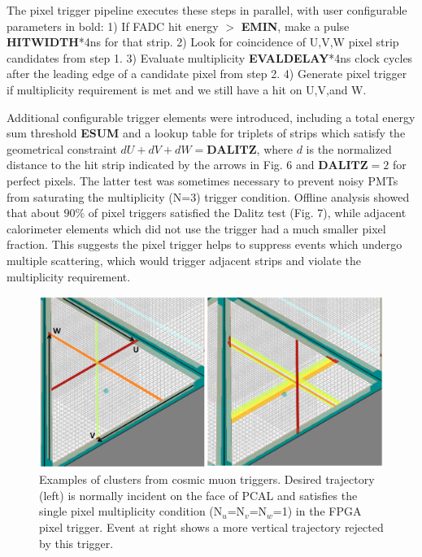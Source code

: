 The pixel trigger pipeline executes these steps in parallel, with user configurable parameters in bold:
  1) If FADC hit energy $>$ \textbf{EMIN}, make a pulse \textbf{HITWIDTH}*4ns for that strip.
  2) Look for coincidence of U,V,W pixel strip candidates from step 1.
  3) Evaluate multiplicity \textbf{EVALDELAY}*4ns clock cycles after the leading edge of a candidate pixel from step 2.
  4) Generate pixel trigger if multiplicity requirement is met and we still have a hit on U,V,and W. 

Additional configurable trigger elements were introduced, including a total energy sum threshold \textbf{ESUM} and a lookup table for triplets of strips which satisfy the geometrical constraint $dU+dV+dW=\textbf{DALITZ}$, where $d$ is the normalized distance to the hit strip indicated by the arrows in Fig. 6 and $\textbf{DALITZ}=2$ for perfect pixels.  The latter test was sometimes necessary to prevent noisy PMTs from saturating the multiplicity (N=3) trigger condition.  Offline analysis showed that about $90\%$ of pixel triggers satisfied the Dalitz test (Fig. 7), while adjacent calorimeter elements which did not use the trigger had a much smaller pixel fraction.  This suggests the pixel trigger helps to suppress events which undergo multiple scattering, which would trigger adjacent strips and violate the multiplicity requirement.
\begin{figure}[!htb]
 \centering
  \includegraphics[width=0.95\columnwidth,keepaspectratio]{img/TwoClusters.png}
 \caption{Examples of clusters from cosmic muon triggers.  Desired trajectory (left) is normally incident on the face of PCAL and satisfies the single pixel multiplicity condition (N$_u$=N$_v$=N$_w$=1) in the FPGA pixel trigger.  Event at right shows a more vertical trajectory rejected by this trigger.}
\end{figure}

